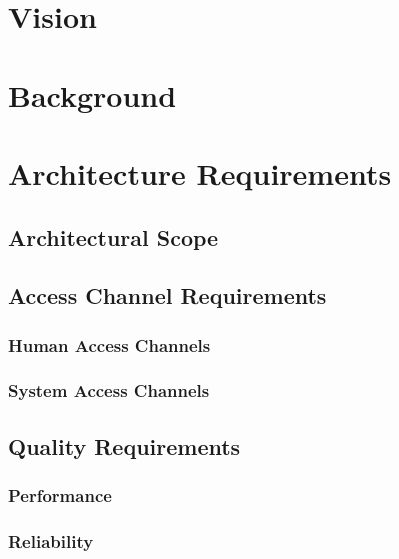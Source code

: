 \documentclass[11pt,fleqn]{book} %
\begin{document}

\chapter{Vision}



\chapter{Background}



\chapter{Architecture Requirements}

	\section{Architectural Scope}
	\section{Access Channel Requirements}
		\subsection{Human Access Channels}
		\subsection{System Access Channels}

	\section{Quality Requirements}
		\subsection{Performance}
		\subsection{Reliability}
\end{document}
